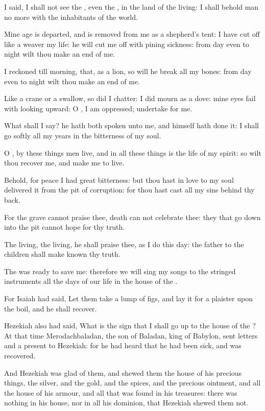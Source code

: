 \Verse I said, I shall not see the \LORD, even the \LORD, in the land of the living: I shall behold man no more with the inhabitants of the world.

\Verse Mine age is departed, and is removed from me as a shepherd's tent: I have cut off like a weaver my life: he will cut me off with pining sickness: from day even to night wilt thou make an end of me.

\Verse I reckoned till morning, that, as a lion, so will he break all my bones: from day even to night wilt thou make an end of me.

\Verse Like a crane or a swallow, so did I chatter: I did mourn as a dove: mine eyes fail with looking upward: O \LORD, I am oppressed; undertake for me.

\Verse What shall I say? he hath both spoken unto me, and himself hath done it: I shall go softly all my years in the bitterness of my soul.

\Verse O \LORD, by these things men live, and in all these things is the life of my spirit: so wilt thou recover me, and make me to live.

\Verse Behold, for peace I had great bitterness: but thou hast in love to my soul delivered it from the pit of corruption: for thou hast cast all my sins behind thy back.

\Verse For the grave cannot praise thee, death can not celebrate thee: they that go down into the pit cannot hope for thy truth.

\Verse The living, the living, he shall praise thee, as I do this day: the father to the children shall make known thy truth.

\Verse The \LORD was ready to save me: therefore we will sing my songs to the stringed instruments all the days of our life in the house of the \LORD.

\Verse For Isaiah had said, Let them take a lump of figs, and lay it for a plaister upon the boil, and he shall recover.

\Verse Hezekiah also had said, What is the sign that I shall go up to the house of the \LORD?  
\Chapter
\Verse At that time Merodachbaladan, the son of Baladan, king of Babylon, sent letters and a present to Hezekiah: for he had heard that he had been sick, and was recovered.

\Verse And Hezekiah was glad of them, and shewed them the house of his precious things, the silver, and the gold, and the spices, and the precious ointment, and all the house of his armour, and all that was found in his treasures: there was nothing in his house, nor in all his dominion, that Hezekiah shewed them not.

